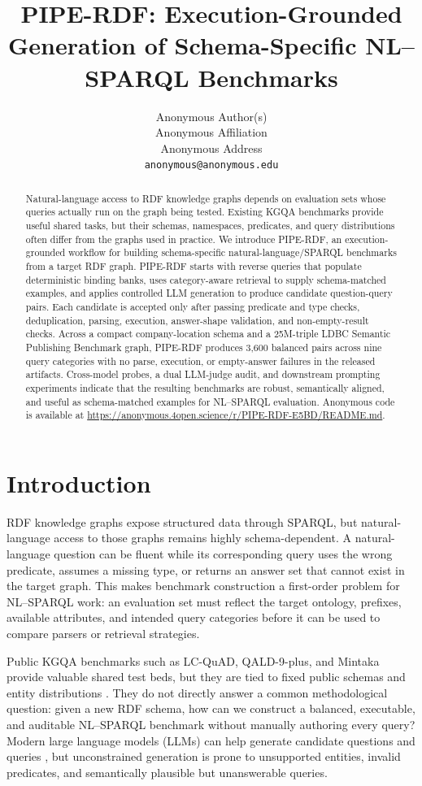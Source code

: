 \documentclass[11pt]{article}
\title{PIPE-RDF: Execution-Grounded Generation of Schema-Specific NL--SPARQL Benchmarks}
\author{
  Anonymous Author(s) \\
  Anonymous Affiliation \\
  Anonymous Address \\
  \texttt{anonymous@anonymous.edu}
}
\begin{document}
\maketitle

\begin{abstract}
Natural-language access to RDF knowledge graphs depends on evaluation sets whose queries actually run on the graph being tested. Existing KGQA benchmarks provide useful shared tasks, but their schemas, namespaces, predicates, and query distributions often differ from the graphs used in practice. We introduce PIPE-RDF, an execution-grounded workflow for building schema-specific natural-language/SPARQL benchmarks from a target RDF graph. PIPE-RDF starts with reverse queries that populate deterministic binding banks, uses category-aware retrieval to supply schema-matched examples, and applies controlled LLM generation to produce candidate question-query pairs. Each candidate is accepted only after passing predicate and type checks, deduplication, parsing, execution, answer-shape validation, and non-empty-result checks. Across a compact company-location schema and a 25M-triple LDBC Semantic Publishing Benchmark graph, PIPE-RDF produces 3{,}600 balanced pairs across nine query categories with no parse, execution, or empty-answer failures in the released artifacts. Cross-model probes, a dual LLM-judge audit, and downstream prompting experiments indicate that the resulting benchmarks are robust, semantically aligned, and useful as schema-matched examples for NL--SPARQL evaluation. Anonymous code is available at \url{https://anonymous.4open.science/r/PIPE-RDF-E5BD/README.md}.
\end{abstract}

\section{Introduction}
RDF knowledge graphs expose structured data through SPARQL, but natural-language access to those graphs remains highly schema-dependent. A natural-language question can be fluent while its corresponding query uses the wrong predicate, assumes a missing type, or returns an answer set that cannot exist in the target graph. This makes benchmark construction a first-order problem for NL--SPARQL work: an evaluation set must reflect the target ontology, prefixes, available attributes, and intended query categories before it can be used to compare parsers or retrieval strategies.

Public KGQA benchmarks such as LC-QuAD, QALD-9-plus, and Mintaka provide valuable shared test beds, but they are tied to fixed public schemas and entity distributions \citep{Trivedi_2017,perevalov2022qald9plusmultilingualdatasetquestion,sen2022mintakacomplexnaturalmultilingual}. They do not directly answer a common methodological question: given a new RDF schema, how can we construct a balanced, executable, and auditable NL--SPARQL benchmark without manually authoring every query? Modern large language models (LLMs) can help generate candidate questions and queries \citep{brown2020languagemodelsfewshotlearners,touvron2023llamaopenefficientfoundation}, but unconstrained generation is prone to unsupported entities, invalid predicates, and semantically plausible but unanswerable queries.
\end{document}
